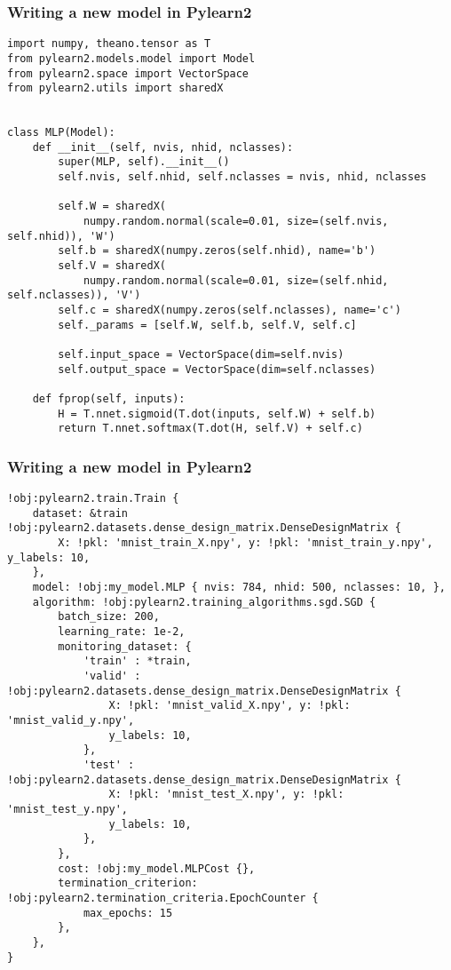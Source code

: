 \documentclass[mathserif, xcolor=dvipsnames]{beamer}
\begin{document}
\begin{frame}[fragile]
    \frametitle{Writing a new model in Pylearn2}
    \begin{examples}
\begin{lstlisting}[caption=Model implementation for MLP]
import numpy, theano.tensor as T
from pylearn2.models.model import Model
from pylearn2.space import VectorSpace
from pylearn2.utils import sharedX


class MLP(Model):
    def __init__(self, nvis, nhid, nclasses):
        super(MLP, self).__init__()
        self.nvis, self.nhid, self.nclasses = nvis, nhid, nclasses

        self.W = sharedX(
            numpy.random.normal(scale=0.01, size=(self.nvis, self.nhid)), 'W')
        self.b = sharedX(numpy.zeros(self.nhid), name='b')
        self.V = sharedX(
            numpy.random.normal(scale=0.01, size=(self.nhid, self.nclasses)), 'V')
        self.c = sharedX(numpy.zeros(self.nclasses), name='c')
        self._params = [self.W, self.b, self.V, self.c]

        self.input_space = VectorSpace(dim=self.nvis)
        self.output_space = VectorSpace(dim=self.nclasses)

    def fprop(self, inputs):
        H = T.nnet.sigmoid(T.dot(inputs, self.W) + self.b)
        return T.nnet.softmax(T.dot(H, self.V) + self.c)
\end{lstlisting}
    \end{examples}
\end{frame}

\begin{frame}[fragile]
    \frametitle{Writing a new model in Pylearn2}
    \begin{examples}
\begin{lstlisting}[caption=Corresponding YAML file]
!obj:pylearn2.train.Train {
    dataset: &train !obj:pylearn2.datasets.dense_design_matrix.DenseDesignMatrix {
        X: !pkl: 'mnist_train_X.npy', y: !pkl: 'mnist_train_y.npy', y_labels: 10,
    },
    model: !obj:my_model.MLP { nvis: 784, nhid: 500, nclasses: 10, },
    algorithm: !obj:pylearn2.training_algorithms.sgd.SGD {
        batch_size: 200,
        learning_rate: 1e-2,
        monitoring_dataset: {
            'train' : *train,
            'valid' : !obj:pylearn2.datasets.dense_design_matrix.DenseDesignMatrix {
                X: !pkl: 'mnist_valid_X.npy', y: !pkl: 'mnist_valid_y.npy',
                y_labels: 10,
            },
            'test' : !obj:pylearn2.datasets.dense_design_matrix.DenseDesignMatrix {
                X: !pkl: 'mnist_test_X.npy', y: !pkl: 'mnist_test_y.npy',
                y_labels: 10,
            },
        },
        cost: !obj:my_model.MLPCost {},
        termination_criterion: !obj:pylearn2.termination_criteria.EpochCounter {
            max_epochs: 15
        },
    },
}
\end{lstlisting}
    \end{examples}
\end{frame}
\end{document}
